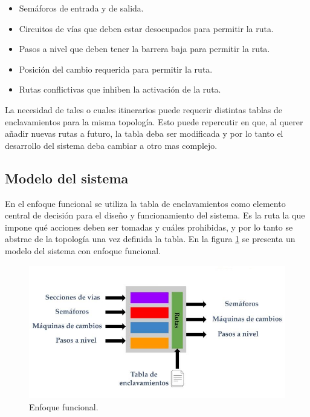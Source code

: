 		\begin{itemize}
			\item Semáforos de entrada y de salida.
			\item Circuitos de vías que deben estar desocupados para permitir la ruta.
			\item Pasos a nivel que deben tener la barrera baja para permitir la ruta.
			\item Posición del cambio requerida para permitir la ruta.
			\item Rutas conflictivas que inhiben la activación de la ruta.
		\end{itemize}
		
		La necesidad de tales o cuales itinerarios puede requerir distintas tablas de enclavamientos para la misma topología. Esto puede repercutir en que, al querer añadir nuevas rutas a futuro, la tabla deba ser modificada y por lo tanto el desarrollo del sistema deba cambiar a otro mas complejo.
	
	\subsection{Modelo del sistema}
	\label{2_3_2}	
		En el enfoque funcional se utiliza la tabla de enclavamientos como elemento central de decisión para el diseño y funcionamiento del sistema. Es la ruta la que impone qué acciones deben ser tomadas y cuáles prohibidas, y por lo tanto se abstrae de la topología una vez definida la tabla. En la figura \ref{fig:Modelo_Funcional} se presenta un modelo del sistema con enfoque funcional.
		
			\begin{figure}[h!]
			\centering
				\includegraphics[scale=.65]{./Figures/Funcional}
				\caption{Enfoque funcional.}
				\label{fig:Modelo_Funcional}
			\end{figure}
		
